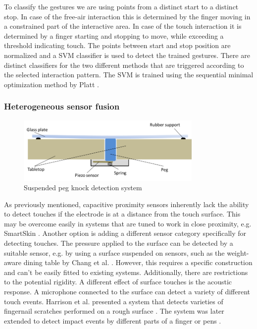 To classify the gestures we are using points from a distinct start to a distinct stop. In case of the free-air interaction this is determined by the finger moving in a constrained part of the interactive area. In case of the touch interaction it is determined  by a finger starting and stopping to move, while exceeding a threshold indicating touch. The points between start and stop position are normalized and a SVM classifier is used to detect the trained gestures. There are distinct classifiers for the two different methods that are triggered according to the selected interaction pattern. The SVM is trained using the sequential minimal optimization method by Platt \cite{platt1999fast}.

\subsubsection{Heterogeneous sensor fusion}
\begin{figure}[ht]
\centering
\includegraphics[width=0.8\textwidth]{images/captap_peg}
\caption{Suspended peg knock detection system}
\label{fig:captap_peg}
\end{figure}

As previously mentioned, capacitive proximity sensors inherently lack the ability to detect touches if the electrode is at a distance from the touch surface. This may be overcome easily in systems that are tuned to work in close proximity, e.g. SmartSkin \cite{rekimoto2002smartskin}. Another option is adding a different sensor category specifically for detecting touches. The pressure applied to the surface can be detected by a suitable sensor, e.g. by using a surface suspended on sensors, such as the weight-aware dining table by Chang et al. \cite{chang2006diet}. However, this requires a specific construction and can't be easily fitted to existing systems. Additionally, there are restrictions to the potential rigidity. A different effect of surface touches is the acoustic response. A microphone connected to the surface can detect a variety of different touch events. Harrison et al. presented a system that detects varieties of fingernail scratches performed on a rough surface \cite{harrison2008scratch}. The system was later extended to detect impact events by different parts of a finger or pens \cite{harrison2011tapsense}. 

